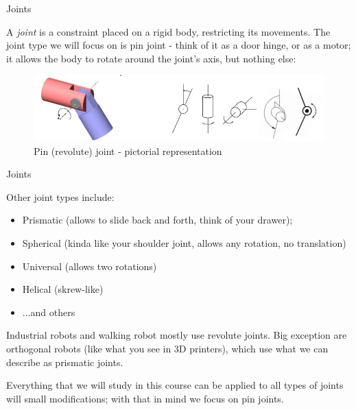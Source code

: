 \documentclass{beamer}
\begin{document}
\begin{frame}{Joints}
	\begin{flushleft}
		
		A \emph{joint} is a constraint placed on a rigid body, restricting its movements. The joint type we will focus on is pin joint - think of it as a door hinge, or as a motor; it allows the body to rotate around the joint's axis, but nothing else:
		
	
		\begin{figure}
			\centering
			\includegraphics[width=0.7\linewidth]{PinJoints}
			\caption{Pin (revolute) joint - pictorial representation}
			\label{fig:pinjoints}
		\end{figure}
		
		
	\end{flushleft}
\end{frame}



\begin{frame}{Joints}
	\begin{flushleft}
		
		Other joint types include:
		
		\begin{itemize}
			\item Prismatic (allows to slide back and forth, think of your drawer);
			\item Spherical (kinda like your shoulder joint, allows any rotation, no translation)
			\item Universal (allows two rotations)
			\item Helical (skrew-like)
			\item ...and others
		\end{itemize}

		Industrial robots and walking robot mostly use revolute joints.	Big exception are orthogonal robots (like what you see in 3D printers), which use what we can describe as prismatic joints.
		
		Everything that we will study in this course can be applied to all types of joints will small modifications; with that in mind we focus on pin joints.	
		
	\end{flushleft}
\end{frame}
\end{document}
